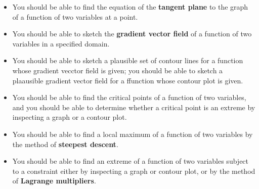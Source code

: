 \begin{itemize}
\item You should be able to find the equation of the \textbf{tangent
  plane} to the graph of a function of two variables at a point.

\item You should be able to sketch the \textbf{gradient vector field}
  of a function of two variables in a specified domain.


\item You should be able to sketch a plausible set of contour lines
  for a function whose gradient vecctor field is given; you should be
  able to sketch a plaausible gradient vector field for a ffunction
  whose contour plot is given.

\item You should be able to find the critical points of a function of
  two variables, and you should be able to determine whether a
  critical point is an extreme by inspecting a graph or a contour
  plot.

\item You should be able to find a local maximum of a function of two
  variables by the method of \textbf{steepest descent}.

\item You should be able to find an extreme of a function of two
  variables subject to a constraint either by inspecting a graph or
  contour plot, or by the method of \textbf{Lagrange multipliers}.

\end{itemize}

\cleardoublepage
